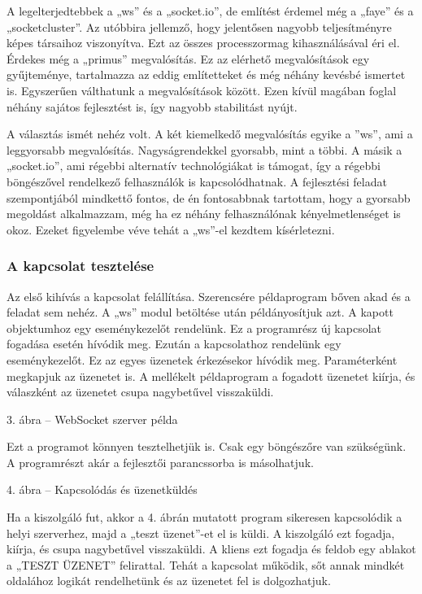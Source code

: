 \documentclass[]{article}
\begin{document}
A legelterjedtebbek a „ws'' és a „socket.io'', de említést érdemel még a
„faye'' és a „socketcluster''. Az utóbbira jellemző, hogy jelentősen
nagyobb teljesítményre képes társaihoz viszonyítva. Ezt az összes
processzormag kihasználásával éri el. Érdekes még a „primus''
megvalósítás. Ez az elérhető megvalósítások egy gyűjteménye, tartalmazza
az eddig említetteket és még néhány kevésbé ismertet is. Egyszerűen
válthatunk a megvalósítások között. Ezen kívül magában foglal néhány
sajátos fejlesztést is, így nagyobb stabilitást nyújt.

A választás ismét nehéz volt. A két kiemelkedő megvalósítás egyike a
''ws'', ami a leggyorsabb megvalósítás. Nagyságrendekkel gyorsabb, mint
a többi. A másik a „socket.io'', ami régebbi alternatív technológiákat
is támogat, így a régebbi böngészővel rendelkező felhasználók is
kapcsolódhatnak. A fejlesztési feladat szempontjából mindkettő fontos,
de én fontosabbnak tartottam, hogy a gyorsabb megoldást alkalmazzam, még
ha ez néhány felhasználónak kényelmetlenséget is okoz. Ezeket figyelembe
véve tehát a „ws''-el kezdtem kísérletezni.


\subsubsection{A kapcsolat tesztelése}

Az első kihívás a kapcsolat felállítása. Szerencsére példaprogram bőven
akad és a feladat sem nehéz. A „ws'' modul betöltése után példányosítjuk
azt. A kapott objektumhoz egy eseménykezelőt rendelünk. Ez a programrész
új kapcsolat fogadása esetén hívódik meg. Ezután a kapcsolathoz
rendelünk egy eseménykezelőt. Ez az egyes üzenetek érkezésekor hívódik
meg. Paraméterként megkapjuk az üzenetet is. A mellékelt példaprogram a
fogadott üzenetet kiírja, és válaszként az üzenetet csupa nagybetűvel
visszaküldi.

3. ábra -- WebSocket szerver példa

Ezt a programot könnyen tesztelhetjük is. Csak egy böngészőre van
szükségünk. A programrészt akár a fejlesztői parancssorba is
másolhatjuk.

4. ábra -- Kapcsolódás és üzenetküldés

Ha a kiszolgáló fut, akkor a 4. ábrán mutatott program sikeresen
kapcsolódik a helyi szerverhez, majd a „teszt üzenet''-et el is küldi. A
kiszolgáló ezt fogadja, kiírja, és csupa nagybetűvel visszaküldi. A
kliens ezt fogadja és feldob egy ablakot a „TESZT ÜZENET'' felirattal.
Tehát a kapcsolat működik, sőt annak mindkét oldalához logikát
rendelhetünk és az üzenetet fel is dolgozhatjuk.
\end{document}
